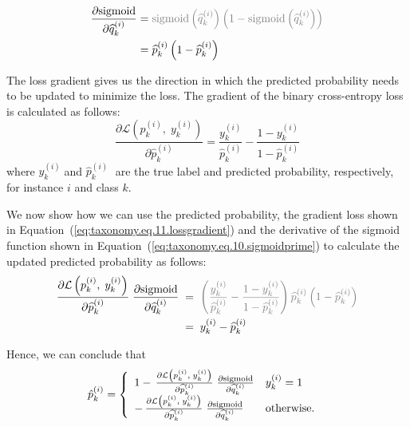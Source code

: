 \documentclass[review,1p,times,numbers]{elsarticle}
\begin{document}
\begin{align}
    \label{eq:taxonomy.eq.10.sigmoidprime}
    \frac{\partial{\text{sigmoid}}}{\partial{\widehat{q}_k^{(i)}}}
    & = \textcolor{gray}{\text{sigmoid}\left(\widehat{q}_k^{(i)}\right)\left(1-\text{sigmoid}\left(\widehat{q}_k^{(i)}\right)\right)}
    \\
    & = \widehat{p}_k^{(i)}\left(1-\widehat{p}_k^{(i)}\right)
\end{align}

The loss gradient gives us the direction in which the predicted probability needs to be updated to minimize the loss. The gradient of the binary cross-entropy loss is calculated as follows:
\begin{equation}
    \label{eq:taxonomy.eq.11.lossgradient}
    \frac{\partial \mathcal{L} \left( \widehat{p}_k^{(i)},\;y_k^{(i)}\right)}{\partial \widehat{p}_k^{(i)} }=\frac{y_k^{(i)}}{\widehat{p}_k^{(i)}}-\frac{1-y_k^{(i)}}{1-\widehat{p}_k^{(i)}}
\end{equation}
where $y_k^{(i)}\; $and $\widehat{p}_k^{(i)}\; $ are the true label and predicted probability, respectively, for instance $i $ and class $k $.

We now show how we can use the predicted probability, the gradient loss shown in Equation~(\ref{eq:taxonomy.eq.11.lossgradient}) and the derivative of the sigmoid function shown in Equation~(\ref{eq:taxonomy.eq.10.sigmoidprime}) to calculate the updated predicted probability as follows:
\begin{align}
    \label{eq:taxonomy.eq.12.newpredelement}
    \frac{\partial \mathcal{L}\left(p_k^{(i)},\; y_k^{(i)}\right)}{\partial \widehat{p}_k^{(i)} }\; \frac{\partial{\text{sigmoid}}}{\partial{\widehat{q}_k^{(i)}}}
    & \; = \; \textcolor{gray}{\left(\frac{y_k^{(i)}}{\widehat{p}_k^{(i)}}-\frac{1-y_k^{(i)}}{1-\widehat{p}_k^{(i)}}\right)\widehat{p}_k^{(i)}\left(1-\widehat{p}_k^{(i)}\right) }
    \\
    & \; = \; y_k^{(i)}-\widehat{p}_k^{(i)}
\end{align}

Hence, we can conclude that
\begin{equation}
    \label{eq:taxonomy.eq.13.newpred}
    \begin{array}{@{}l}
    \hat{p}_{k}^{(i)} = \left\{
        \begin{array}{ll}
            1-\, \frac{\partial \mathcal{L}\left(p_k^{(i)},\;y_k^{(i)}\right)}{\partial \widehat{p}_k^{(i)} }\;{ \frac{\partial{\text{sigmoid}}}{\partial{\widehat{q}_k^{(i)}}}}
            &
            y_k^{(i)}=1
            \\
            -\,\frac{\partial \mathcal{L}\left(p_k^{(i)},\;y_k^{(i)}\right)}{\partial \widehat{p}_k^{(i)} }\; {\frac{\partial{\text{sigmoid}}}{\partial{\widehat{q}_k^{(i)}}}}
            &
            \text{otherwise.}
        \end{array}\right.
    \end{array}
\end{equation}
\end{document}
